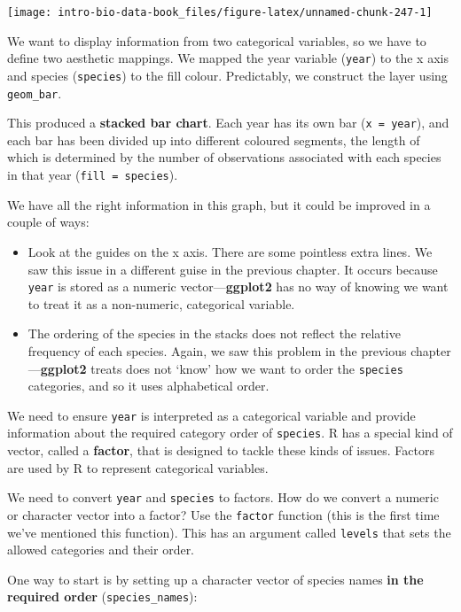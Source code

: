 \documentclass[
]{book}
\providecommand{\tightlist}{%
  \setlength{\itemsep}{0pt}\setlength{\parskip}{0pt}}
\begin{document}
\begin{center}\texttt{[image: intro-bio-data-book\_files/figure-latex/unnamed-chunk-247-1]} \end{center}

We want to display information from two categorical variables, so we have to define two aesthetic mappings. We mapped the year variable (\texttt{year}) to the x axis and species (\texttt{species}) to the fill colour. Predictably, we construct the layer using \texttt{geom\_bar}.

This produced a \textbf{stacked bar chart}. Each year has its own bar (\texttt{x\ =\ year}), and each bar has been divided up into different coloured segments, the length of which is determined by the number of observations associated with each species in that year (\texttt{fill\ =\ species}).

We have all the right information in this graph, but it could be improved in a couple of ways:

\begin{itemize}
\tightlist
\item
  Look at the guides on the x axis. There are some pointless extra lines. We saw this issue in a different guise in the previous chapter. It occurs because \texttt{year} is stored as a numeric vector---\textbf{ggplot2} has no way of knowing we want to treat it as a non-numeric, categorical variable.
\item
  The ordering of the species in the stacks does not reflect the relative frequency of each species. Again, we saw this problem in the previous chapter---\textbf{ggplot2} treats does not `know' how we want to order the \texttt{species} categories, and so it uses alphabetical order.
\end{itemize}

We need to ensure \texttt{year} is interpreted as a categorical variable and provide information about the required category order of \texttt{species}. R has a special kind of vector, called a \textbf{factor}, that is designed to tackle these kinds of issues. Factors are used by R to represent categorical variables.

We need to convert \texttt{year} and \texttt{species} to factors. How do we convert a numeric or character vector into a factor? Use the \texttt{factor} function (this is the first time we've mentioned this function). This has an argument called \texttt{levels} that sets the allowed categories and their order.

One way to start is by setting up a character vector of species names \textbf{in the required order} (\texttt{species\_names}):
\end{document}
